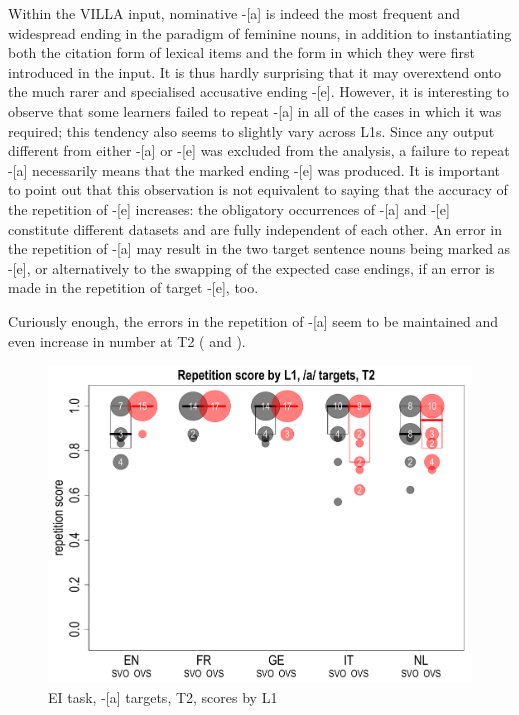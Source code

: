 Within the VILLA input, nominative -[a] is indeed the most frequent and widespread ending in the paradigm of feminine nouns, in addition to instantiating both the citation form of lexical items and the form in which they were first introduced in the input. It is thus hardly surprising that it may overextend onto the much rarer and specialised accusative ending -[e]. However, it is interesting to observe that some learners failed to repeat -[a] in all of the cases in which it was required; this tendency also seems to slightly vary across L1s. Since any output different from either -[a] or -[e] was excluded from the analysis, a failure to repeat -[a] necessarily means that the marked ending -[e] was produced. It is important to point out that this observation is not equivalent to saying that the accuracy of the repetition of -[e] increases: the obligatory occurrences of -[a] and -[e] constitute different datasets and are fully independent of each other. An error in the repetition of -[a] may result in the two target sentence nouns being marked as -[e], or alternatively to the swapping of the expected case endings, if an error is made in the repetition of target -[e], too.

Curiously enough, the errors in the repetition of -[a] seem to be maintained and even increase in number at T2 ( and ).

\begin{figure}
    \includegraphics[width=\textwidth]{figures/04-7.pdf}
    \caption{EI task, -[a] targets, T2, scores by L1}
    \label{fig:04:7}
\end{figure}

